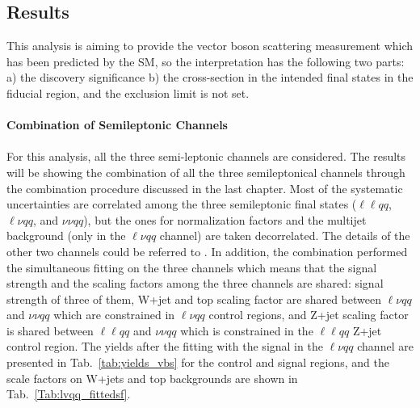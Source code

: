 \subsection{Results}
This analysis is aiming to provide the vector boson scattering measurement which has been predicted by the SM, so the interpretation has the following two parts: a) the discovery significance b) the cross-section in the intended final states in the fiducial region, and the exclusion limit is not set. 
\\
\\{\bf Combination of Semileptonic Channels}
\\
\\For this analysis, all the three semi-leptonic channels are considered. The results will be showing the combination of all the three semileptonical channels through the combination procedure discussed in the last chapter. Most of the systematic uncertainties are correlated among the three semileptonic final states ($\ell\ell qq$, $\ell\nu qq$, and $\nu\nu qq$), but the ones for normalization factors and the multijet background (only in the $\ell\nu qq$ channel) are taken decorrelated. The details of the other two channels could be referred to \cite{Aad:2019xxo}. In addition, the combination performed the simultaneous fitting on the three channels which means that the signal strength and the scaling factors among the three channels are shared: signal strength of three of them, W+jet and top scaling factor are shared between $\ell\nu qq$ and $\nu\nu qq$ which are constrained in $\ell\nu qq$ control regions, and Z+jet scaling factor is shared between $\ell\ell qq$ and $\nu\nu qq$ which is constrained in the $\ell\ell qq$ Z+jet control region. The yields after the fitting with the signal in the $\ell\nu qq$ channel are presented in Tab.~\ref{tab:yields_vbs} for the control and signal regions, and the scale factors on W+jets and top backgrounds are shown in Tab.~\ref{Tab:lvqq_fittedsf}.
